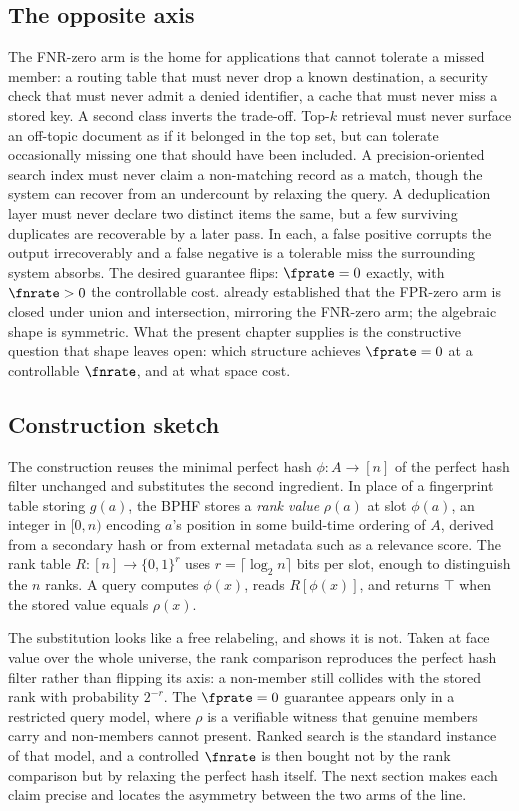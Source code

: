 \subsection*{The opposite axis}

The FNR-zero arm is the home for applications that cannot tolerate a
missed member: a routing table that must never drop a known
destination, a security check that must never admit a denied identifier,
a cache that must never miss a stored key. A second class inverts the
trade-off. Top-$k$ retrieval must never surface an off-topic document as
if it belonged in the top set, but can tolerate occasionally missing one
that should have been included. A precision-oriented search index must
never claim a non-matching record as a match, though the system can
recover from an undercount by relaxing the query. A deduplication layer
must never declare two distinct items the same, but a few surviving
duplicates are recoverable by a later pass. In each, a false positive
corrupts the output irrecoverably and a false negative is a tolerable
miss the surrounding system absorbs. The desired guarantee flips:
$\fprate = 0$ exactly, with $\fnrate > 0$ the controllable cost.
 already established that the FPR-zero arm is
closed under union and intersection, mirroring the FNR-zero arm; the
algebraic shape is symmetric. What the present chapter supplies is the
constructive question that shape leaves open: which structure achieves
$\fprate = 0$ at a controllable $\fnrate$, and at what space cost.

\subsection*{Construction sketch}

The construction reuses the minimal perfect hash $\phi : A \to [n]$ of
the perfect hash filter unchanged and substitutes the second ingredient. In place of
a fingerprint table storing $g(a)$, the BPHF stores a \emph{rank value}
$\rho(a)$ at slot $\phi(a)$, an integer in $[0, n)$ encoding $a$'s
position in some build-time ordering of $A$, derived from a secondary
hash or from external metadata such as a relevance score. The rank table
$R : [n] \to \{0, 1\}^r$ uses $r = \lceil \log_2 n \rceil$ bits per slot,
enough to distinguish the $n$ ranks. A query computes $\phi(x)$, reads
$R[\phi(x)]$, and returns $\top$ when the stored value equals $\rho(x)$.

The substitution looks like a free relabeling, and 
shows it is not. Taken at face value over the whole universe, the
rank comparison reproduces the perfect hash filter rather than flipping
its axis: a non-member still collides with the stored rank with
probability $2^{-r}$. The $\fprate = 0$ guarantee appears only in a restricted query
model, where $\rho$ is a verifiable witness that genuine members carry
and non-members cannot present. Ranked search is the standard instance
of that model, and a controlled $\fnrate$ is then bought not by the rank
comparison but by relaxing the perfect hash itself. The next section
makes each claim precise and locates the asymmetry between the two arms
of the line.
